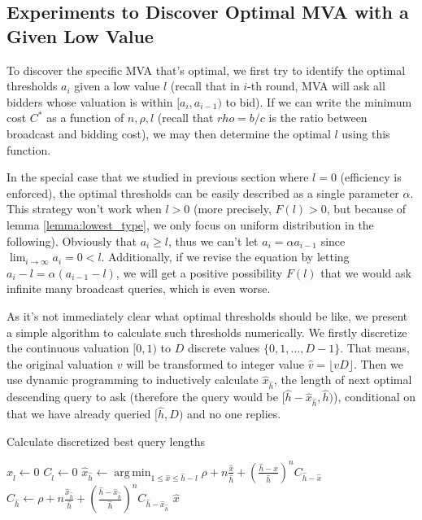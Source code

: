 \subsection{Experiments to Discover Optimal MVA with a Given Low Value}

To discover the specific MVA that's optimal, we first try to identify the
optimal thresholds $a_i$ given a low value $l$  (recall that in $i$-th round,
MVA will ask all bidders whose valuation is within $[a_i, a_{i-1})$ to bid).
If we can write the minimum cost $C^*$ as a function of $n, \rho, l$ (recall
that $rho = b/c$ is the ratio between broadcast and bidding cost), we may then
determine the optimal $l$ using this function.

In the special case that we studied in previous section where $l = 0$
(efficiency is enforced), the optimal thresholds can be easily described as a
single parameter $\alpha$. This strategy won't work when $l > 0$ (more
precisely, $F(l) > 0$, but because of lemma \ref{lemma:lowest_type}, we only
focus on uniform distribution in the following). Obviously that $a_i \geq l$,
thus we can't let $a_i = \alpha a_{i-1}$ since $\lim_{i \rightarrow \infty} a_i
= 0 < l$.  Additionally, if we revise the equation by letting $a_i-l = \alpha
(a_{i-1}-l)$, we will get a positive possibility $F(l)$ that we would ask
infinite many broadcast queries, which is even worse.

As it's not immediately clear what optimal thresholds should be like, we
present a simple algorithm to calculate such thresholds numerically. We firstly
discretize the continuous valuation $[0, 1)$ to $D$ discrete values $\{0, 1, \ldots,
D-1\}$. That means, the original valuation $v$ will be transformed to integer
value $\hat v = \lfloor v D \rfloor$. Then we use dynamic programming to
inductively calculate $\hat x_{\hat h}$, the length of next optimal descending query to ask
(therefore the query would be $[\hat h-\hat x_{\hat h}, \hat h)$), conditional on that we have
already queried $[\hat h, D)$ and no one replies.

\begin{algorithm}
    \caption{Calculate discretized best query lengths}\label{algo:discrete}
    \begin{algorithmic}[1]
        
            \State $\hat x_{\hat l} \gets 0$
            \State $C_{\hat l} \gets 0$
                \State $\hat x_{\hat h} \gets \displaystyle
                  \operatorname*{arg\,min}_{1 \leq \hat x \leq \hat h-l} \rho + n
                  \frac{\hat x}{\hat h} + (\frac{\hat h-x}{\hat h})^n C_{\hat h-\hat x}$
                \State $C_{\hat h} \gets \rho + n \frac{\hat x_{\hat h}}{\hat h} +
                  (\frac{\hat h-\hat x_{\hat h}}{\hat h})^n C_{\hat h-\hat x_{\hat h}}$
            \EndFor
            \State \Return $\hat x$
        \EndFunction
    \end{algorithmic}
\end{algorithm}

